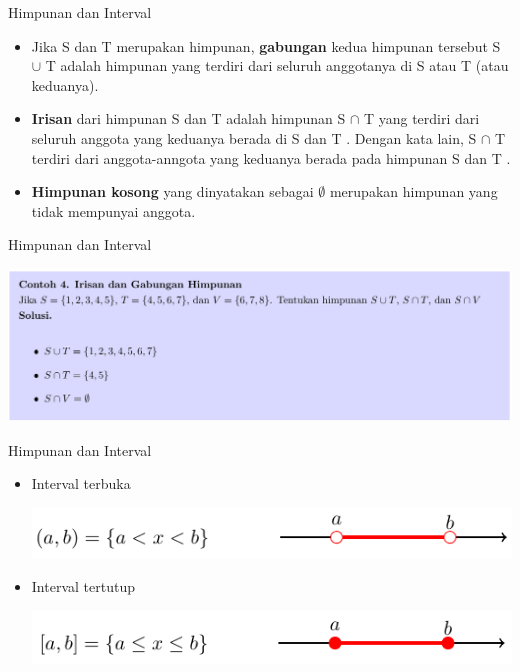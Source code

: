 \documentclass[pdflatex,compress,mathserif]{beamer}
\begin{document}
\begin{frame}{Himpunan dan Interval}
	\begin{itemize}
		\item Jika S dan T merupakan himpunan, \textbf{gabungan} kedua himpunan tersebut S $\cup$ T adalah himpunan yang terdiri dari seluruh anggotanya di S atau T (atau keduanya).
		\item \textbf{Irisan} dari himpunan S dan T adalah himpunan S $\cap$ T yang terdiri dari seluruh anggota yang keduanya berada di S dan T . Dengan kata lain, S $\cap$ T terdiri dari anggota-anngota yang keduanya berada pada himpunan S dan T .
		\item \textbf{Himpunan kosong} yang dinyatakan sebagai $\emptyset$ merupakan himpunan yang tidak mempunyai anggota.
	\end{itemize}
\end{frame}

\begin{frame}{Himpunan dan Interval}
	\begin{center}
		\includegraphics[width=\linewidth]{img/img13}
	\end{center}
\end{frame}

\begin{frame}{Himpunan dan Interval}
	\begin{itemize}
		\item Interval terbuka
		\begin{center}
			\includegraphics[width=\linewidth]{img/img14}
		\end{center}
		\item Interval tertutup
		\begin{center}
			\includegraphics[width=\linewidth]{img/img15}
		\end{center}
	\end{itemize}
\end{frame}
\end{document}
